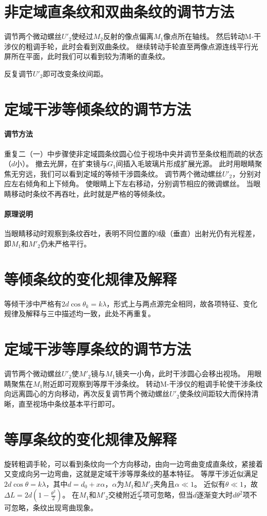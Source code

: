 \documentclass[12pt, a4paper]{ctexart}
\begin{document}
\section{非定域直条纹和双曲条纹的调节方法}
调节两个微动螺丝$U'_2$使经过$M_2$反射的像点偏离$M_1$像点所在轴线。
然后转动M-干涉仪的粗调手轮，此时会看到双曲条纹。
继续转动手轮直至两像点源连线平行光屏所在平面，此时我们可以看到较为清晰的直条纹。

反复调节$U'_2$即可改变条纹间距。

\section{定域干涉等倾条纹的调节方法}

\paragraph{调节方法}
重复二（一）中步骤使非定域圆条纹圆心位于视场中央并调节至条纹粗而疏的状态（$d$小）。
撤去光屏，在扩束镜与$G_1$间插入毛玻璃片形成扩展光源。
此时用眼睛聚焦无穷远，我们可以看到定域的等倾干涉圆条纹。
调节两个微动螺丝$U'_2$，分别对应左右倾角和上下倾角。
使眼睛上下左右移动，分别调节相应的微调螺丝。
当眼睛移动时条纹不再吞吐，此时就是严格的等倾条纹。

\paragraph{原理说明}
当眼睛移动时观察到条纹吞吐，表明不同位置的0级（垂直）出射光仍有光程差，即$M_1$和$M'_2$仍未严格平行。

\section{等倾条纹的变化规律及解释}
等倾干涉中严格有$2d \cos \theta_k = k \lambda$，形式上与两点源完全相同，故各项特征、变化规律及解释与三中描述均一致，此处不再重复。

\section{定域干涉等厚条纹的调节方法}
调节两个微动螺丝$U'_2$使$M'_2$镜与$M_1$镜夹一小角，此时干涉圆心会移出视场。
用眼睛聚焦在$M_1$附近即可观察到等厚干涉条纹。
转动M-干涉仪的粗调手轮使干涉条纹向远离圆心的方向移动，再次反复调节两个微动螺丝$U'_2$使条纹间距较大而保持清晰，直至视场中条纹基本平行即可。

\section{等厚条纹的变化规律及解释}
旋转粗调手轮，可以看到条纹向一个方向移动，由向一边弯曲变成直条纹，紧接着又变成向另一边弯曲，这就是定域干涉等厚条纹的基本特征。
等厚干涉近似满足$2d \cos \theta = k \lambda$，其中$d = d_0 + x \alpha$，$\alpha$为$M_1$和$M'_2$夹角且$\alpha \ll 1$。
近似有$\theta \ll 1$，故$\Delta L = 2d (1 - \frac{\theta^2}{2})$。
在$M_1$和$M'_2$交棱附近$\frac{\theta^2}{2}$项可忽略，但当$d$逐渐变大时$d\theta^2$项不可忽略，条纹出现弯曲现象。
\end{document}
